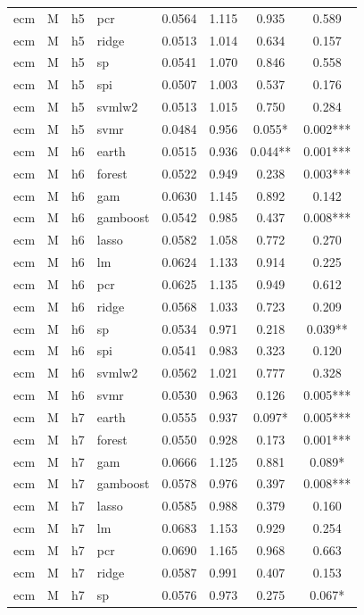 \begin{ThreePartTable}
\begin{longtable}[t]{llclcccc}
ecm & M & h5 & pcr & 0.0564 & 1.115 & 0.935 & 0.589\\
ecm & M & h5 & ridge & 0.0513 & 1.014 & 0.634 & 0.157\\
ecm & M & h5 & sp & 0.0541 & 1.070 & 0.846 & 0.558\\
ecm & M & h5 & spi & 0.0507 & 1.003 & 0.537 & 0.176\\
ecm & M & h5 & svmlw2 & 0.0513 & 1.015 & 0.750 & 0.284\\
ecm & M & h5 & svmr & 0.0484 & 0.956 & 0.055* & 0.002***\\
\addlinespace
ecm & M & h6 & earth & 0.0515 & 0.936 & 0.044** & 0.001***\\
ecm & M & h6 & forest & 0.0522 & 0.949 & 0.238 & 0.003***\\
ecm & M & h6 & gam & 0.0630 & 1.145 & 0.892 & 0.142\\
ecm & M & h6 & gamboost & 0.0542 & 0.985 & 0.437 & 0.008***\\
ecm & M & h6 & lasso & 0.0582 & 1.058 & 0.772 & 0.270\\
ecm & M & h6 & lm & 0.0624 & 1.133 & 0.914 & 0.225\\
ecm & M & h6 & pcr & 0.0625 & 1.135 & 0.949 & 0.612\\
ecm & M & h6 & ridge & 0.0568 & 1.033 & 0.723 & 0.209\\
ecm & M & h6 & sp & 0.0534 & 0.971 & 0.218 & 0.039**\\
ecm & M & h6 & spi & 0.0541 & 0.983 & 0.323 & 0.120\\
ecm & M & h6 & svmlw2 & 0.0562 & 1.021 & 0.777 & 0.328\\
ecm & M & h6 & svmr & 0.0530 & 0.963 & 0.126 & 0.005***\\
\addlinespace
ecm & M & h7 & earth & 0.0555 & 0.937 & 0.097* & 0.005***\\
ecm & M & h7 & forest & 0.0550 & 0.928 & 0.173 & 0.001***\\
ecm & M & h7 & gam & 0.0666 & 1.125 & 0.881 & 0.089*\\
ecm & M & h7 & gamboost & 0.0578 & 0.976 & 0.397 & 0.008***\\
ecm & M & h7 & lasso & 0.0585 & 0.988 & 0.379 & 0.160\\
ecm & M & h7 & lm & 0.0683 & 1.153 & 0.929 & 0.254\\
ecm & M & h7 & pcr & 0.0690 & 1.165 & 0.968 & 0.663\\
ecm & M & h7 & ridge & 0.0587 & 0.991 & 0.407 & 0.153\\
ecm & M & h7 & sp & 0.0576 & 0.973 & 0.275 & 0.067*\\

\end{longtable}
\end{ThreePartTable}
